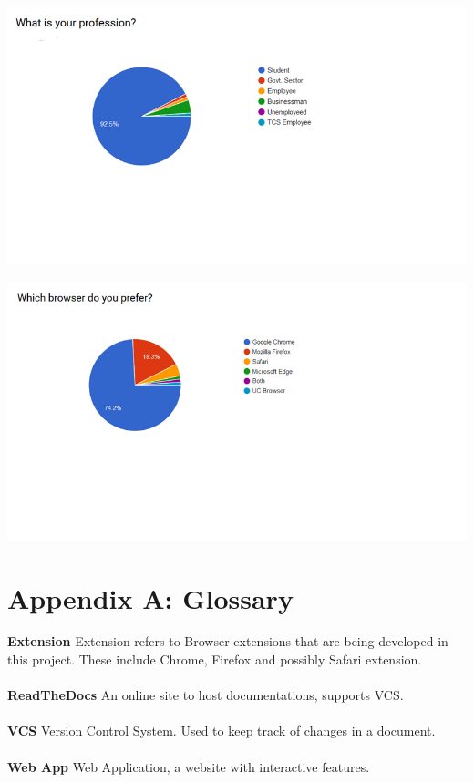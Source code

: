 \documentclass[12pt]{article}
\begin{document}
  \includegraphics[width=\linewidth]{srs12.png}
  
  \includegraphics[width=\linewidth]{srs13.png}
  
  
  



\section{Appendix A: Glossary}
\textbf{Extension} Extension refers to Browser extensions that are being developed in this project. These include Chrome, Firefox and possibly Safari extension.\\\\
\textbf{ReadTheDocs} An online site to host documentations, supports VCS.\\\\
\textbf{VCS} Version Control System. Used to keep track of changes in a document.\\\\
\textbf{Web App} Web Application, a website with interactive features.\\\\  
  
\end{document}

